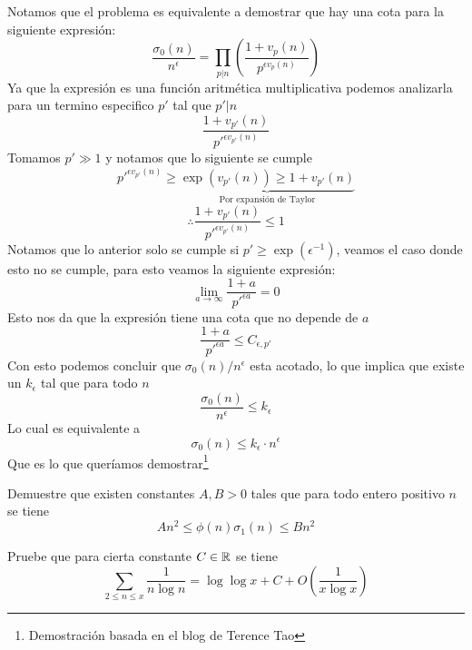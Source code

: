 \begin{sol}
    Notamos que el problema es equivalente a demostrar que hay una cota para la siguiente expresión:
    \[\frac{\sigma_0(n)}{n^\epsilon}=\prod_{p|n}\left(\frac{1+v_p(n)}{p^{\epsilon v_p(n)}}\right)\]
    Ya que la expresión es una función aritmética multiplicativa podemos analizarla para un termino especifico $p'$ tal que $p'|n$
    \[\frac{1+v_{p'}(n)}{p'^{\epsilon v_{p'}(n)}}\]
    Tomamos $p'\gg 1$ y notamos que lo siguiente se cumple
    \[p'^{\epsilon v_{p'}(n)}\geq\underbrace{\exp(v_{p'}(n))\geq 1+v_{p'}(n)}_{\text{Por expansión de Taylor}}\]
    \[\therefore \frac{1+v_{p'}(n)}{p'^{\epsilon v_{p'}(n)}}\leq 1\]
    Notamos que lo anterior solo se cumple si $p'\geq\exp(\epsilon^{-1})$, veamos el caso donde esto no se cumple, para esto veamos la siguiente expresión:
    \[\lim_{a\rightarrow\infty}\frac{1+a}{p'^{\epsilon a}}=0\]
    Esto nos da que la expresión tiene una cota que no depende de $a$
    \[\frac{1+a}{p'^{\epsilon a}}\leq C_{\epsilon,p'}\]
    Con esto podemos concluir que $\sigma_0(n)/n^\epsilon$ esta acotado, lo que implica que existe un $k_\epsilon$ tal que para todo $n$
    \[\frac{\sigma_0(n)}{n^\epsilon}\leq k_\epsilon\]
    Lo cual es equivalente a
    \[\sigma_0(n)\leq k_\epsilon\cdot n^\epsilon\]
    Que es lo que queríamos demostrar\footnote{Demostración basada en el blog de Terence Tao\cite{tao}}
\end{sol}

\begin{prob}
	Demuestre que existen constantes $A,B > 0$ tales que para todo entero positivo $n$ se tiene
	\[An^2\leq\phi(n)\sigma_1(n)\leq Bn^2\]
\end{prob}

\begin{sol}
\cite{hardy}
\end{sol}

\begin{prob}
	Pruebe que para cierta constante $C \in \mathbb{R}$ se tiene
	\[\sum_{2\leq n\leq x}\frac{1}{n\log n}=\log\log x+C+O\left(\frac{1}{x\log x}\right)\]
\end{prob}

